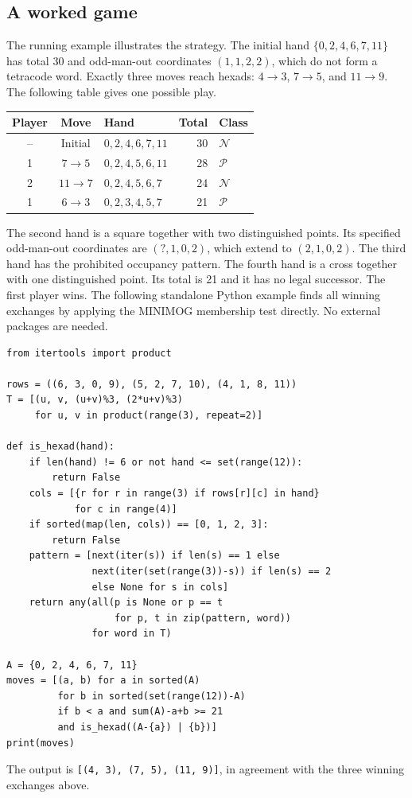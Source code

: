 \documentclass[12pt,letterpaper]{article}
\theoremstyle{definition}\newtheorem{example}[theorem]{Example}
\numberwithin{equation}{section}
\begin{document}
\subsection{A worked game}
The running example illustrates the strategy. The initial hand $\{0,2,4,6,7,11\}$ has total 30 and odd-man-out coordinates $(1,1,2,2)$, which do not form a tetracode word. Exactly three moves reach hexads: $4\to3$, $7\to5$, and $11\to9$. The following table gives one possible play.

\begin{center}
\begin{tabular}{cclrl}\toprule
Player&Move&Hand&Total&Class\\\midrule
--&Initial&$0,2,4,6,7,11$&30&$\mathcal N$\\
1&$7\to5$&$0,2,4,5,6,11$&28&$\mathcal P$\\
2&$11\to7$&$0,2,4,5,6,7$&24&$\mathcal N$\\
1&$6\to3$&$0,2,3,4,5,7$&21&$\mathcal P$\\\bottomrule
\end{tabular}
\end{center}

The second hand is a square together with two distinguished points. Its specified odd-man-out coordinates are $(?,1,0,2)$, which extend to $(2,1,0,2)$. The third hand has the prohibited occupancy pattern. The fourth hand is a cross together with one distinguished point. Its total is 21 and it has no legal successor. The first player wins. The following standalone Python example finds all winning exchanges by applying the MINIMOG membership test directly. No external packages are needed.
\begin{verbatim}
from itertools import product

rows = ((6, 3, 0, 9), (5, 2, 7, 10), (4, 1, 8, 11))
T = [(u, v, (u+v)%3, (2*u+v)%3)
     for u, v in product(range(3), repeat=2)]

def is_hexad(hand):
    if len(hand) != 6 or not hand <= set(range(12)):
        return False
    cols = [{r for r in range(3) if rows[r][c] in hand}
            for c in range(4)]
    if sorted(map(len, cols)) == [0, 1, 2, 3]:
        return False
    pattern = [next(iter(s)) if len(s) == 1 else
               next(iter(set(range(3))-s)) if len(s) == 2
               else None for s in cols]
    return any(all(p is None or p == t
                   for p, t in zip(pattern, word))
               for word in T)

A = {0, 2, 4, 6, 7, 11}
moves = [(a, b) for a in sorted(A)
         for b in sorted(set(range(12))-A)
         if b < a and sum(A)-a+b >= 21
         and is_hexad((A-{a}) | {b})]
print(moves)
\end{verbatim}
The output is \texttt{[(4, 3), (7, 5), (11, 9)]}, in agreement with the three winning exchanges above.
\end{document}
